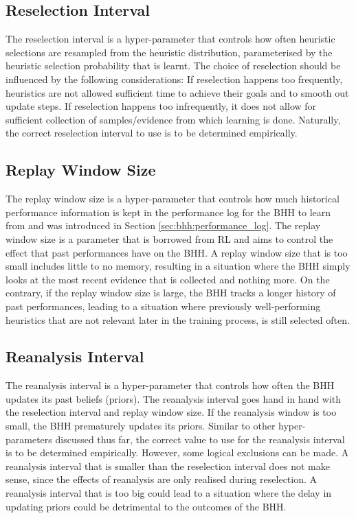\subsection{Reselection Interval}\label{sec:bhh:hyper_parameters:reselection}

The reselection interval is a hyper-parameter that controls how often heuristic selections are resampled from the heuristic distribution, parameterised by the heuristic selection probability that is learnt. The choice of reselection should be influenced by the following considerations: If reselection happens too frequently, heuristics are not allowed sufficient time to achieve their goals and to smooth out update steps. If reselection happens too infrequently, it does not allow for sufficient collection of samples/evidence from which learning is done. Naturally, the correct reselection interval to use is to be determined empirically.

\subsection{Replay Window Size}\label{sec:bhh:hyper_parameters:replay}

The replay window size is a hyper-parameter that controls how much historical performance information is kept in the performance log for the \acs{BHH} to learn from and was introduced in Section \ref{sec:bhh:performance_log}. The replay window size is a parameter that is borrowed from \acf{RL} and aims to control the effect that past performances have on the \acs{BHH}. A replay window size that is too small includes little to no memory, resulting in a situation where the \acs{BHH} simply looks at the most recent evidence that is collected and nothing more. On the contrary, if the replay window size is large, the \acs{BHH} tracks a longer history of past performances, leading to a situation where previously well-performing heuristics that are not relevant later in the training process, is still selected often.

\subsection{Reanalysis Interval}\label{sec:bhh:hyper_parameters:reanalysis}

The reanalysis interval is a hyper-parameter that controls how often the \acs{BHH} updates its past beliefs (priors). The reanalysis interval goes hand in hand with the reselection interval and replay window size. If the reanalysis window is too small, the \acs{BHH} prematurely updates its priors. Similar to other hyper-parameters discussed thus far, the correct value to use for the reanalysis interval is to be determined empirically. However, some logical exclusions can be made. A reanalysis interval that is smaller than the reselection interval does not make sense, since the effects of reanalysis are only realised during reselection. A reanalysis interval that is too big could lead to a situation where the delay in updating priors could be detrimental to the outcomes of the \acs{BHH}.

